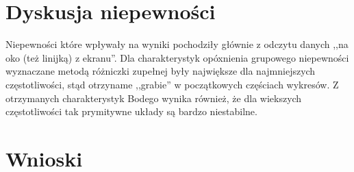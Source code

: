 \documentclass[a4paper,11pt]{article}
\begin{document}
\section{Dyskusja niepewności}

Niepewności które wpływały na wyniki pochodziły głównie z odczytu danych ,,na oko (też linijką) z ekranu''. Dla charakterystyk opóxnienia grupowego niepewności wyznaczane metodą różniczki zupełnej były największe dla najmniejszych częstotliwości, stąd otrzyname ,,grabie'' w początkowych częściach wykresów. Z otrzymanych charakterystyk Bodego wynika również, że dla wiekszych częstotliwości tak prymitywne układy są bardzo niestabilne.  

\section{Wnioski}
\end{document}

